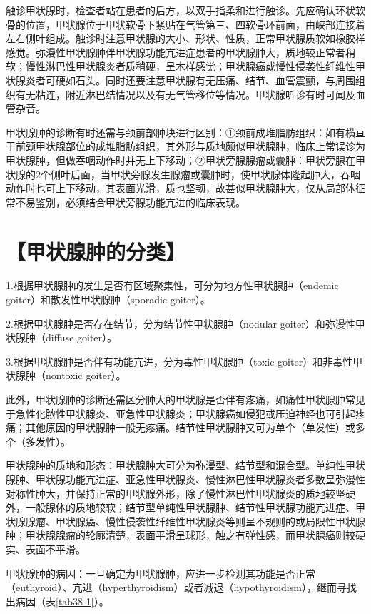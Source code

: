 触诊甲状腺时，检查者站在患者的后方，以双手指柔和进行触诊。先应确认环状软骨的位置，甲状腺位于甲状软骨下紧贴在气管第三、四软骨环前面，由峡部连接着左右侧叶组成。触诊时注意甲状腺的大小、形状、性质，正常甲状腺质软如橡胶样感觉。弥漫性甲状腺肿伴甲状腺功能亢进症患者的甲状腺肿大，质地较正常者稍软；慢性淋巴性甲状腺炎者质稍硬，呈木样感觉；甲状腺癌或慢性侵袭性纤维性甲状腺炎者可硬如石头。同时还要注意甲状腺有无压痛、结节、血管震颤，与周围组织有无粘连，附近淋巴结情况以及有无气管移位等情况。甲状腺听诊有时可闻及血管杂音。

甲状腺肿的诊断有时还需与颈前部肿块进行区别：①颈前成堆脂肪组织：如有横亘于前颈甲状腺部位的成堆脂肪组织，其外形与质地颇似甲状腺肿，临床上常误诊为甲状腺肿，但做吞咽动作时并无上下移动；②甲状旁腺腺瘤或囊肿：甲状旁腺在甲状腺的2个侧叶后面，当甲状旁腺发生腺瘤或囊肿时，使甲状腺体隆起肿大，吞咽动作时也可上下移动，其表面光滑，质也坚韧，故甚似甲状腺肿大，仅从局部体征常不易鉴别，必须结合甲状旁腺功能亢进的临床表现。

\section{【甲状腺肿的分类】}

1.根据甲状腺肿的发生是否有区域聚集性，可分为地方性甲状腺肿（endemic
goiter）和散发性甲状腺肿（sporadic goiter）。

2.根据甲状腺肿是否存在结节，分为结节性甲状腺肿（nodular
goiter）和弥漫性甲状腺肿（diffuse goiter）。

3.根据甲状腺肿是否伴有功能亢进，分为毒性甲状腺肿（toxic
goiter）和非毒性甲状腺肿（nontoxic goiter）。

此外，甲状腺肿的诊断还需区分肿大的甲状腺是否伴有疼痛，如痛性甲状腺肿常见于急性化脓性甲状腺炎、亚急性甲状腺炎；甲状腺癌如侵犯或压迫神经也可引起疼痛；其他原因的甲状腺肿一般无疼痛。结节性甲状腺肿又可为单个（单发性）或多个（多发性）。

甲状腺肿的质地和形态：甲状腺肿大可分为弥漫型、结节型和混合型。单纯性甲状腺肿、甲状腺功能亢进症、亚急性甲状腺炎、慢性淋巴性甲状腺炎者多数呈弥漫性对称性肿大，并保持正常的甲状腺外形，除了慢性淋巴性甲状腺炎的质地较坚硬外，一般腺体的质地较软；结节型单纯性甲状腺肿、结节性甲状腺功能亢进症、甲状腺腺瘤、甲状腺癌、慢性侵袭性纤维性甲状腺炎等则呈不规则的或局限性甲状腺肿；甲状腺腺瘤的轮廓清楚，表面平滑呈球形，触之有弹性感，而甲状腺癌则较硬实、表面不平滑。

甲状腺肿的病因：一旦确定为甲状腺肿，应进一步检测其功能是否正常（euthyroid）、亢进（hyperthyroidism）或者减退（hypothyroidism），继而寻找出病因（表\ref{tab38-1}）。

